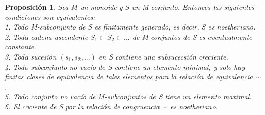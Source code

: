 \documentclass[12pt,spanish]{amsart}
\newtheorem{prop}[Theorem]{Proposición}
\theoremstyle{definition}
\theoremstyle{remark}
\begin{document}
\begin{prop}
Sea M un monoide y S un M-conjunto. Entonces las siguientes condiciones son equivalentes: \\ 
1. Todo M-subconjunto de S es finitamente generado, es decir, S es noetheriano. \\ 
2. Toda cadena ascendente $S_{1} \subset S_{2} \subset ...$ de M-conjuntos de S es eventualmente constante. \\ 
3. Toda sucesión $(s_{1},s_{2},...)$ en S contiene una subsucecsión creciente. \\ 
4. Todo subconjunto no vacío de S contiene un elemento minimal, y solo hay finitas clases de equivalencia de tales elementos para la relación de equivalencia $\sim$.  \\ 
5. Todo conjunto no vacío de M-subconjuntos de S tiene un elemento maximal.  \\ 
6. El cociente de S por la relación de congruencia $\sim$ es noetheriano.  
\end{prop}
\end{document}
